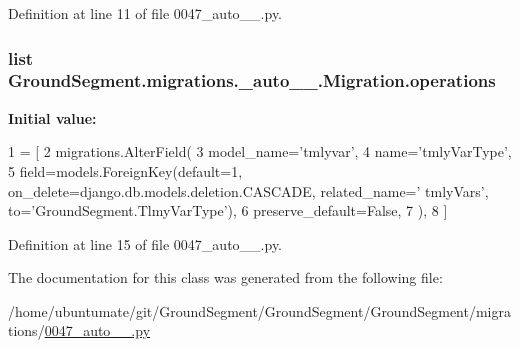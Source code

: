 Definition at line 11 of file 0047\+\_\+auto\+\_\+\_.\+py.

\hypertarget{class_ground_segment_1_1migrations_1_10047__auto__20170207__1238_1_1_migration_a0c2deb0027d2825797edb39bc5d286ef}{}
\subsubsection[{operations}]{\setlength{\rightskip}{0pt plus 5cm}list Ground\+Segment.\+migrations.\+\_\+auto\+\_\+\_.\+Migration.\+operations\hspace{0.3cm}{\ttfamily [static]}}\label{class_ground_segment_1_1migrations_1_10047__auto__20170207__1238_1_1_migration_a0c2deb0027d2825797edb39bc5d286ef}
{\bfseries Initial value\+:}
\begin{DoxyCode}
1 = [
2         migrations.AlterField(
3             model\_name=\textcolor{stringliteral}{'tmlyvar'},
4             name=\textcolor{stringliteral}{'tmlyVarType'},
5             field=models.ForeignKey(default=1, on\_delete=django.db.models.deletion.CASCADE, related\_name=\textcolor{stringliteral}{'
      tmlyVars'}, to=\textcolor{stringliteral}{'GroundSegment.TlmyVarType'}),
6             preserve\_default=\textcolor{keyword}{False},
7         ),
8     ]
\end{DoxyCode}


Definition at line 15 of file 0047\+\_\+auto\+\_\+\_.\+py.



The documentation for this class was generated from the following file\+:\begin{DoxyCompactItemize}
\item 
/home/ubuntumate/git/\+Ground\+Segment/\+Ground\+Segment/\+Ground\+Segment/migrations/\hyperlink{0047__auto__20170207__1238_8py}{0047\+\_\+auto\+\_\+\_.\+py}\end{DoxyCompactItemize}
